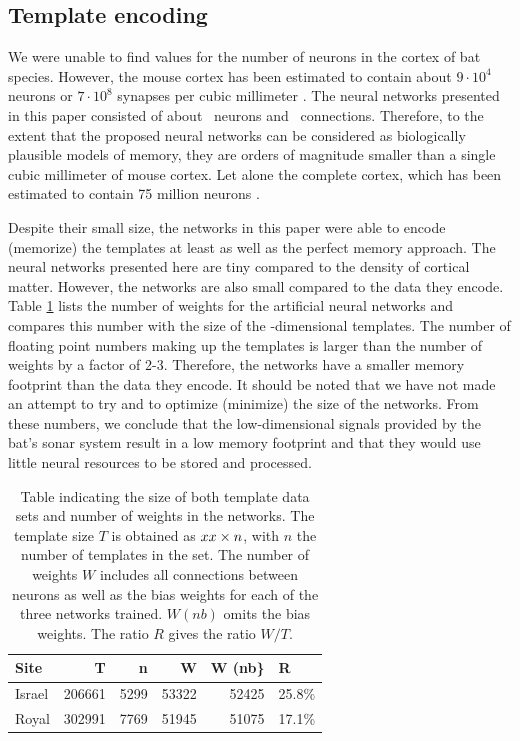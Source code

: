 \documentclass[preprint,5p]{elsarticle}
\begin{document}
\subsection{Template encoding}

We were unable to find values for the number of neurons in the cortex of bat species. However, the mouse cortex has been estimated to contain about $9 \cdot 10^4$ neurons or $7 \cdot 10^8$ synapses per cubic millimeter \citep{Braitenberg2013}. The neural networks presented in this paper consisted of about \nneurons\ neurons and \nweights\ connections. Therefore, to the extent that the proposed neural networks can be considered as biologically plausible models of memory, they are orders of magnitude smaller than a single cubic millimeter of mouse cortex. Let alone the complete cortex, which has been estimated to contain 75 million neurons \citep{Williams2000}. 

Despite their small size, the networks in this paper were able to encode (memorize) the templates at least as well as the perfect memory approach. The neural networks presented here are tiny compared to the density of cortical matter. However, the networks are also small compared to the data they encode. Table \ref{tab:sizes} lists the number of weights for the artificial neural networks and compares this number with the size of the \pca-dimensional templates. The number of floating point numbers making up the templates is larger than the number of weights by a factor of 2-3. Therefore, the networks have a smaller memory footprint than the data they encode. It should be noted that we have not made an attempt to try and to optimize (minimize) the size of the networks. From these numbers, we conclude that the low-dimensional signals provided by the bat's sonar system result in a low memory footprint and that they would use little neural resources to be stored and processed.

\begin{table}
	\centering
\begin{tabular}{lrrrrl}
	\toprule
	Site &       T &     n &      W &  W (nb\} &      R \\
	\midrule
	Israel &  206661 &  5299 &  53322 &   52425 &  25.8\% \\
	Royal &  302991 &  7769 &  51945 &   51075 &  17.1\% \\
	\bottomrule
\end{tabular}
	\label{tab:sizes}
	\caption{Table indicating the size of both template data sets and number of weights in the networks. The template size $T$ is obtained as $xx \times n$, with $n$ the number of templates in the set. The number of weights $W$ includes all connections between neurons as well as the bias weights for each of the three networks trained. $W (nb)$ omits the bias weights. The ratio $R$ gives the ratio $W/T$.}
\end{table}
\end{document}
